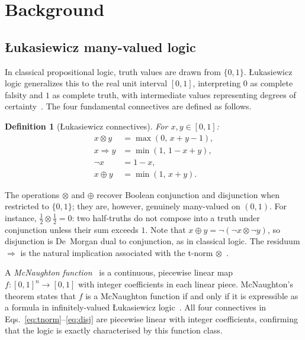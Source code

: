 \documentclass[lettersize,journal]{IEEEtran}
\newtheorem{definition}[theorem]{Definition}
\newcommand{\tnorm}{\otimes}      %
\newcommand{\resid}{\Rightarrow}  %
\newcommand{\disj}{\oplus}        %
\begin{document}
\section{Background}
\label{sec:background}

\subsection{\L{}ukasiewicz many-valued logic}
\label{ssec:logic}

In classical propositional logic, truth values are drawn from $\{0,1\}$.
\L{}ukasiewicz logic generalizes this to the real unit interval $[0,1]$,
interpreting $0$ as complete falsity and $1$ as complete truth, with
intermediate values representing degrees of certainty~\cite{hajek1998}.
The four fundamental connectives are defined as follows.
\begin{definition}[\L{}ukasiewicz connectives]
For $x, y \in [0,1]$:
\begin{align}
  x \tnorm y  &= \max(0,\, x + y - 1),   \label{eq:tnorm}\\
  x \resid y  &= \min(1,\, 1 - x + y),   \label{eq:resid}\\
  \neg x       &= 1 - x,                  \label{eq:neg}\\
  x \disj y   &= \min(1,\, x + y).       \label{eq:disj}
\end{align}
\end{definition}
The operations $\tnorm$ and $\disj$ recover Boolean conjunction and disjunction
when restricted to $\{0,1\}$; they are, however, genuinely many-valued on $(0,1)$.
For instance, $\tfrac{1}{2} \tnorm \tfrac{1}{2} = 0$: two half-truths do not
compose into a truth under conjunction unless their sum exceeds $1$.
Note that $x \disj y = \neg(\neg x \tnorm \neg y)$, so disjunction is
De~Morgan dual to conjunction, as in classical logic.
The residuum $\resid$ is the natural implication associated with the t-norm
$\tnorm$~\cite{hajek1998}.

A \emph{McNaughton function}~\cite{mcnaughton1951} is a continuous, piecewise
linear map $f\colon [0,1]^n \to [0,1]$ with integer coefficients in each linear
piece.
McNaughton's theorem states that $f$ is a McNaughton function if and only if
it is expressible as a formula in infinitely-valued \L{}ukasiewicz
logic~\cite{mcnaughton1951,mundici1986}.
All four connectives in Eqs.~\eqref{eq:tnorm}--\eqref{eq:disj} are
piecewise linear with integer coefficients, confirming that the logic is
exactly characterised by this function class.
\end{document}
